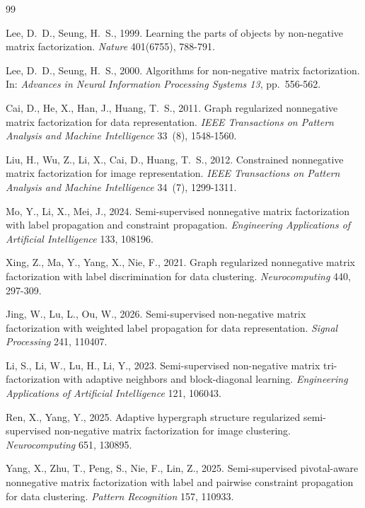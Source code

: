\documentclass[11pt]{article}
\theoremstyle{remark}
\begin{document}
\balance
\footnotesize
\begin{thebibliography}{99}

Lee, D.~D., Seung, H.~S., 1999.
Learning the parts of objects by non-negative matrix factorization.
\emph{Nature} 401(6755), 788-791.

Lee, D.~D., Seung, H.~S., 2000.
Algorithms for non-negative matrix factorization.
In: \emph{Advances in Neural Information Processing Systems 13}, pp.~556-562.

Cai, D., He, X., Han, J., Huang, T.~S., 2011.
Graph regularized nonnegative matrix factorization for data representation.
\emph{IEEE Transactions on Pattern Analysis and Machine Intelligence} 33~(8), 1548-1560.

Liu, H., Wu, Z., Li, X., Cai, D., Huang, T.~S., 2012.
Constrained nonnegative matrix factorization for image representation.
\emph{IEEE Transactions on Pattern Analysis and Machine Intelligence} 34~(7), 1299-1311.

Mo, Y., Li, X., Mei, J., 2024.
Semi-supervised nonnegative matrix factorization with label propagation and constraint propagation.
\emph{Engineering Applications of Artificial Intelligence} 133, 108196.

Xing, Z., Ma, Y., Yang, X., Nie, F., 2021.
Graph regularized nonnegative matrix factorization with label discrimination for data clustering.
\emph{Neurocomputing} 440, 297-309.

Jing, W., Lu, L., Ou, W., 2026.
Semi-supervised non-negative matrix factorization with weighted label propagation for data representation.
\emph{Signal Processing} 241, 110407.

Li, S., Li, W., Lu, H., Li, Y., 2023.
Semi-supervised non-negative matrix tri-factorization with adaptive neighbors and block-diagonal learning.
\emph{Engineering Applications of Artificial Intelligence} 121, 106043.

Ren, X., Yang, Y., 2025.
Adaptive hypergraph structure regularized semi-supervised non-negative matrix factorization for image clustering.
\emph{Neurocomputing} 651, 130895.

Yang, X., Zhu, T., Peng, S., Nie, F., Lin, Z., 2025.
Semi-supervised pivotal-aware nonnegative matrix factorization with label and pairwise constraint propagation for data clustering.
\emph{Pattern Recognition} 157, 110933.


\end{thebibliography}
\end{document}
